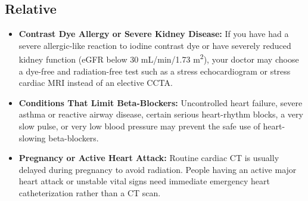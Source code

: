 \subsection{Relative}
\begin{itemize}
    \item \textbf{Contrast Dye Allergy or Severe Kidney Disease:} If you have had a severe allergic-like reaction to iodine contrast dye or have severely reduced kidney function (eGFR below 30 mL/min/1.73 m\textsuperscript{2}), your doctor may choose a dye-free and radiation-free test such as a stress echocardiogram or stress cardiac MRI instead of an elective CCTA.
    \item \textbf{Conditions That Limit Beta-Blockers:} Uncontrolled heart failure, severe asthma or reactive airway disease, certain serious heart-rhythm blocks, a very slow pulse, or very low blood pressure may prevent the safe use of heart-slowing beta-blockers.
    \item \textbf{Pregnancy or Active Heart Attack:} Routine cardiac CT is usually delayed during pregnancy to avoid radiation. People having an active major heart attack or unstable vital signs need immediate emergency heart catheterization rather than a CT scan.
\end{itemize}

